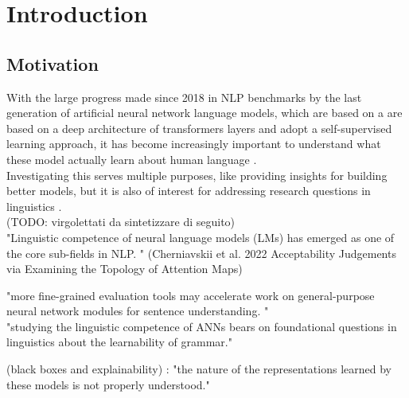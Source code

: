 
\chapter{Introduction}


\section{Motivation}

With the large progress made since 2018 in NLP benchmarks by the last generation of artificial neural network language models, which are based on a  are based on a deep architecture of transformers layers and adopt a self-supervised learning approach, it has become increasingly important to understand what these model actually learn about human language \citep{hewitt2019structural, manning2020emergent, trotta2021monolingual}. \\
Investigating this serves multiple purposes, like providing insights for building better models, but it is also of interest for addressing research questions in linguistics \citep{hewitt2019structural}.  \\

(TODO: virgolettati da sintetizzare di seguito) \\

"Linguistic competence of neural language models (LMs) has emerged as one of the core sub-fields in NLP. "  (Cherniavskii et al. 2022 Acceptability Judgements via Examining the Topology of Attention Maps)

"more fine-grained evaluation tools may accelerate work on general-purpose neural network modules for sentence understanding. " \\
"studying the linguistic competence of ANNs bears on foundational questions in linguistics about the learnability of grammar."

(black boxes and explainability) : "the nature of the representations learned by these models is not properly understood." \citep{wilcox2018rnn}




